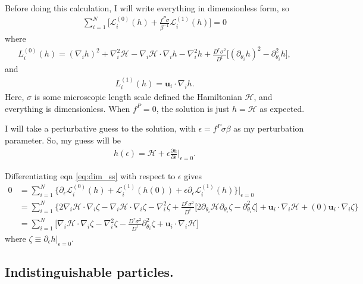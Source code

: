 \documentclass{article}
\begin{document}
Before doing this calculation, I will write everything in dimensionless form, so
\begin{align}\label{eq:dim_ss}
  \sum_{i=1}^N\big[\mathcal{L}_i^{(0)}(h)+ \frac{f^P\sigma}{\beta^{-1}}
  \mathcal{L}_i^{(1)}(h)\big] = 0
\end{align}
where
\begin{align}
  L_i^{(0)}(h)=(\nabla_i h)^2 + \nabla_i^2\mathcal{H}
  -\nabla_i\mathcal{H}\cdot\nabla_ih-\nabla_i^2h +\frac{D^r\sigma^2}{D^t}
  \big[(\partial_{\theta_i}h)^2-\partial_{\theta_i}^2h\big],
\end{align}
and
\begin{align}
  L_i^{(1)}(h)=\bm{u}_i\cdot\nabla_ih.
\end{align}
Here, $\sigma$ is some microscopic length scale defined the Hamiltonian
$\mathcal{H}$, and everything is dimensionless. When $f^P=0$, the solution
is just $h=\mathcal{H}$ as expected.

I will take a perturbative guess to the solution, with $\epsilon=f^P\sigma\beta$
as my perturbation parameter. So, my guess will be
\begin{align}
  h(\epsilon) = \mathcal{H}
  + \epsilon\frac{\partial h}{\partial \epsilon}\bigg|_{\epsilon=0}.
\end{align}

Differentiating eqn \ref{eq:dim_ss} with respect to $\epsilon$ gives
\begin{align}\label{eq:first_perturb_DE}
  0
  &=\sum_{i=1}^N\big\{\partial_{\epsilon}\mathcal{L}_i^{(0)}(h)
    + \mathcal{L}_i^{(1)}(h(0))
    +\epsilon\partial_{\epsilon}\mathcal{L}_i^{(1)}
    (h)\big\}\bigg|_{\epsilon=0}\nonumber\\
  &=\sum_{i=1}^N\big\{2\nabla_i \mathcal{H}\cdot\nabla_i\zeta
    - \nabla_i\mathcal{H}\cdot\nabla_i\zeta
    -\nabla_i^2\zeta+\frac{D^r\sigma^2}{D^t}
    \big[2\partial_{\theta_i}\mathcal{H}\partial_{\theta_i}\zeta
    -\partial_{\theta_i}^2\zeta\big]
    + \bm{u}_i\cdot\nabla_i\mathcal{H}
    +(0)\bm{u}_i\cdot\nabla_i\zeta\big\}\nonumber\\
  &=\sum_{i=1}^N\big[\nabla_i \mathcal{H}\cdot\nabla_i\zeta
    -\nabla_i^2\zeta - \frac{D^r\sigma^2}{D^t}
    \partial_{\theta_i}^2\zeta
    + \bm{u}_i\cdot\nabla_i\mathcal{H}\big]
\end{align}
where $\zeta\equiv\partial_{\epsilon}h|_{\epsilon=0}$.

\subsection{Indistinguishable particles.}
\end{document}
